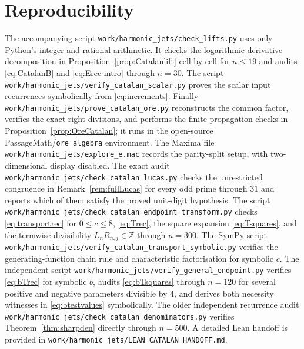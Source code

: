 \documentclass[11pt]{article}
\theoremstyle{definition}
\theoremstyle{remark}
\begin{document}
\section{Reproducibility}

The accompanying script \nolinkurl{work/harmonic_jets/check_lifts.py} uses only Python's
integer and rational arithmetic.  It checks the logarithmic-derivative decomposition in
Proposition~\ref{prop:Catalanlift} cell by cell for $n\le19$ and audits
\eqref{eq:CatalanB} and \eqref{eq:Erec-intro} through $n=30$.  The script
\nolinkurl{work/harmonic_jets/verify_catalan_scalar.py} proves the scalar input
recurrences symbolically from \eqref{eq:increments}.  Finally
\nolinkurl{work/harmonic_jets/prove_catalan_ore.py} reconstructs the common factor,
verifies
the exact right divisions, and performs the finite propagation checks in
Proposition~\ref{prop:OreCatalan}; it runs in the open-source
PassageMath/\texttt{ore\_algebra} environment.  The Maxima file
\nolinkurl{work/harmonic_jets/explore_e.mac} records the parity-split setup, with
two-dimensional display disabled.  The exact audit
\nolinkurl{work/harmonic_jets/check_catalan_lucas.py} checks the unrestricted
congruence in Remark~\ref{rem:fullLucas} for every odd prime through $31$ and reports
which of them satisfy the proved unit-digit hypothesis.
The script \nolinkurl{work/harmonic_jets/check_catalan_endpoint_transform.py} checks
\eqref{eq:transportrec} for $0\le c\le8$, \eqref{eq:Trec}, the square expansion
\eqref{eq:Tsquares}, and the termwise divisibility $L_nR_{n,j}\in\mathbb Z$ through
$n=300$.  The SymPy script
\nolinkurl{work/harmonic_jets/verify_catalan_transport_symbolic.py} verifies the
generating-function chain rule and characteristic factorisation for symbolic $c$.
The independent script
\nolinkurl{work/harmonic_jets/verify_general_endpoint.py} verifies
\eqref{eq:bTrec} for symbolic $b$, audits \eqref{eq:bTsquares} through $n=120$ for
several positive and negative parameters divisible by $4$, and derives both necessity
witnesses in \eqref{eq:btestvalues} symbolically.
The older independent recurrence audit
\nolinkurl{work/harmonic_jets/check_catalan_denominators.py} verifies
Theorem~\ref{thm:sharpden} directly through $n=500$.
A detailed Lean handoff is provided in
\nolinkurl{work/harmonic_jets/LEAN_CATALAN_HANDOFF.md}.
\end{document}
